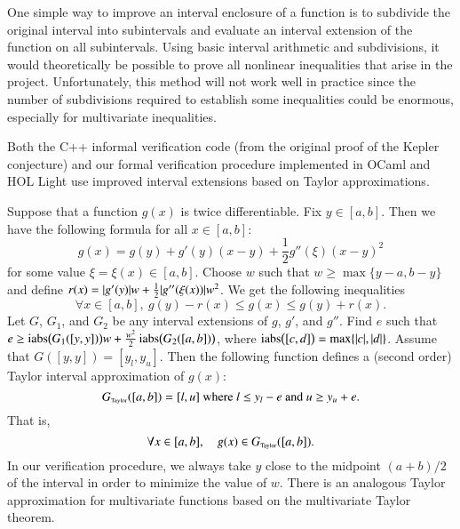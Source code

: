 One simple way to improve an interval enclosure of a function is to
subdivide the original interval into subintervals and evaluate an
interval extension of the function on all subintervals.  Using basic
interval arithmetic and subdivisions, it would theoretically be
possible to prove all nonlinear inequalities that arise in the
project. Unfortunately, this method will not work well in practice
since the number of subdivisions required to establish some
inequalities could be enormous, especially for multivariate
inequalities.

Both the  C++ informal verification code (from
the original proof of the Kepler conjecture) and our formal
verification procedure implemented in OCaml and HOL Light use improved
interval extensions based on Taylor approximations.

Suppose that a function $g(x)$ is twice differentiable. Fix $y \in
[a,b]$. Then we have the following formula for all $x \in [a,b]$:
\begin{equation*}
g(x) = g(y) + g'(y)(x - y) + \frac{1}{2}g''(\xi)(x - y)^2
\end{equation*}
for some value $\xi = \xi(x) \in [a,b]$.  Choose $w$ such that $w \ge
\max\{y - a, b - y\}$ and define $r(x) = \lvert g'(y)\rvert w +
\frac{1}{2}\lvert g''(\xi(x))\rvert w^2$. We get the following inequalities
\begin{equation*}
\forall x \in [a,b],\ g(y) - r(x) \le g(x) \le g(y) + r(x).
\end{equation*}
Let $G$, $G_1$, and $G_2$ be any interval extensions of $g$, $g'$, and
$g''$. Find $e$ such that $e \ge \mathop{\rm iabs}\bigl(G_1([y,y])\bigr)w +
\frac{w^2}{2}\mathop{\rm iabs}\bigl(G_2([a,b])\bigr)$, where
$\mathop{\rm iabs}\bigl([c,d]\bigr) = \max\{\lvert c\rvert, \lvert d\rvert\}$.  Assume that
$G([y,y]) = [y_l,y_u]$. Then the following function defines a (second
order) Taylor interval approximation of $g(x)$:
\begin{equation*}
G_{\hbox{\tiny Taylor}}([a,b]) = [l, u] \text{ where $l \le y_l - e$ and $u \ge y_u + e$}.
\end{equation*}
That is,
\begin{equation*}
\forall x \in [a,b], \quad g(x) \in G_{\hbox{\tiny Taylor}}([a,b]).
\end{equation*}
In our verification procedure, we always take $y$ close to the
midpoint $(a+b)/2$ of the interval in order to minimize the value of
$w$. There is an analogous Taylor approximation for multivariate
functions based on the multivariate Taylor theorem.

